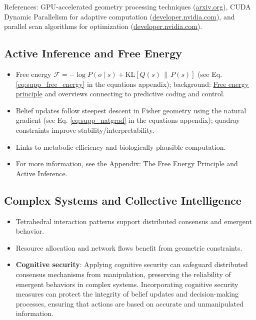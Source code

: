 \documentclass[
  10pt,
]{article}
\providecommand{\tightlist}{%
  \setlength{\itemsep}{0pt}\setlength{\parskip}{0pt}}
\begin{document}
References: GPU-accelerated geometry processing techniques
(\href{https://arxiv.org/abs/1501.04706?utm_source=openai}{arxiv.org}),
CUDA Dynamic Parallelism for adaptive computation
(\href{https://developer.nvidia.com/blog/introduction-cuda-dynamic-parallelism/?utm_source=openai}{developer.nvidia.com}),
and parallel scan algorithms for optimization
(\href{https://developer.nvidia.com/gpugems/gpugems3/part-vi-gpu-computing?utm_source=openai}{developer.nvidia.com}).

\hypertarget{active-inference-and-free-energy}{%
\subsection{Active Inference and Free
Energy}\label{active-inference-and-free-energy}}

\begin{itemize}
\tightlist
\item
  Free energy
  \(\mathcal{F} = -\log P(o\mid s) + \mathrm{KL}[Q(s)\,\|\,P(s)]\) (see
  Eq. \eqref{eq:supp_free_energy} in the equations appendix);
  background:
  \href{https://en.wikipedia.org/wiki/Free_energy_principle}{Free energy
  principle} and overviews connecting to predictive coding and control.
\item
  Belief updates follow steepest descent in Fisher geometry using the
  natural gradient (see Eq. \eqref{eq:supp_natgrad} in the equations
  appendix); quadray constraints improve stability/interpretability.
\item
  Links to metabolic efficiency and biologically plausible computation.
\item
  For more information, see the Appendix: The Free Energy Principle and
  Active Inference.
\end{itemize}

\hypertarget{complex-systems-and-collective-intelligence}{%
\subsection{Complex Systems and Collective
Intelligence}\label{complex-systems-and-collective-intelligence}}

\begin{itemize}
\tightlist
\item
  Tetrahedral interaction patterns support distributed consensus and
  emergent behavior.
\item
  Resource allocation and network flows benefit from geometric
  constraints.
\item
  \textbf{Cognitive security}: Applying cognitive security can safeguard
  distributed consensus mechanisms from manipulation, preserving the
  reliability of emergent behaviors in complex systems. Incorporating
  cognitive security measures can protect the integrity of belief
  updates and decision-making processes, ensuring that actions are based
  on accurate and unmanipulated information.
\end{itemize}
\end{document}
